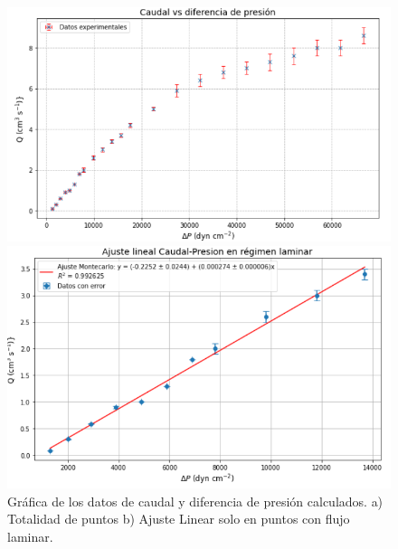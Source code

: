 \begin{figure}[H]
	\centering
	\begin{minipage}{0.46\textwidth} 
		\includegraphics[width=\textwidth]{grafico_01x01_caudal_presion.png}
	\end{minipage}
	\begin{minipage}{0.46\textwidth} 
		\includegraphics[width=\textwidth]{grafico_01x02_ajuste_lineal_caudal_presion.png}
	\end{minipage}
	\caption{ \footnotesize Gráfica de los datos de caudal y diferencia de presión calculados. {a) Totalidad de puntos b) Ajuste Linear solo en puntos con flujo laminar.}}
	\label{fig:qp}
\end{figure}
	
